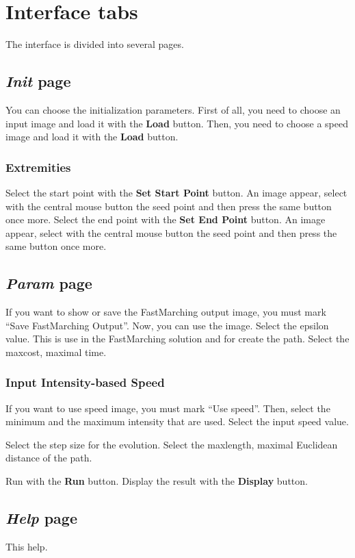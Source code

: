 \documentclass{article}
\begin{document}
\section{Interface tabs}

The interface is divided into several pages.

\subsection{\emph{Init} page}

You can choose the initialization parameters.
First of all, you need to choose an input image and load it with the {\bf Load} button. 
Then, you need to choose a speed image and load it with the {\bf Load} button.

\subsubsection{Extremities}
Select the start point with the {\bf Set Start Point} button. An image appear, select with the central mouse button the seed point and then press the same button once more.
Select the end point with the {\bf Set End Point} button. An image appear, select with the central mouse button the seed point and then press the same button once more.


\subsection{\emph{Param} page}
If you want to show or save the FastMarching output image, you must mark ``Save FastMarching Output''. Now, you can use the image.
Select the epsilon value. This is use in the FastMarching solution and for create the path.
Select the maxcost, maximal time.

\subsubsection{Input Intensity-based Speed}
If you want to use speed image, you must mark ``Use speed''.
Then, select the minimum and the maximum intensity that are used.
Select the input speed value.


Select the step size for the evolution.
Select the maxlength, maximal Euclidean distance of the path.

Run with the {\bf Run} button.
Display the result with the {\bf Display} button.

\subsection{\emph{Help} page}
This help.
\end{document}
